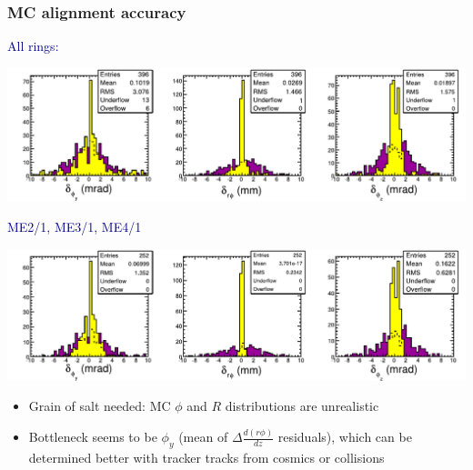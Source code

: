 \documentclass[compress]{beamer}
\begin{document}
\begin{frame}
\frametitle{MC alignment accuracy}

\textcolor{darkblue}{All rings:}

\includegraphics[width=0.9\linewidth]{MCBeamHalo-all_align_step6.pdf}

\vspace{0.2 cm}
\textcolor{darkblue}{ME2/1, ME3/1, ME4/1}

\includegraphics[width=0.9\linewidth]{MCBeamHalo-inner_align_step6.pdf}

\begin{itemize}
\item Grain of salt needed: MC $\phi$ and $R$ distributions are unrealistic

\item Bottleneck seems to be $\phi_y$ (mean of $\Delta \frac{d(r\phi)}{dz}$ residuals), which can be determined better with tracker tracks from cosmics or collisions
\end{itemize}
\end{frame}
\end{document}
